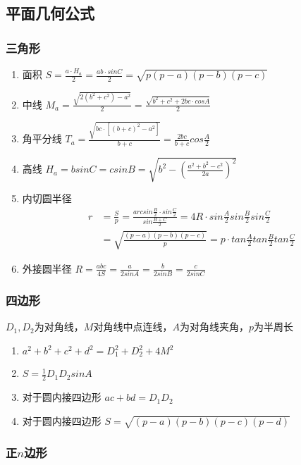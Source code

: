 \documentclass[landscape,twocolumn,a4paper]{article}
\begin{document}
\subsection{平面几何公式}

\subsubsection{三角形}

\begin{enumerate}
	\item 面积
	$S=\frac{a \cdot H_a}{2}=\frac{ab \cdot sinC}{2}=\sqrt{p(p-a)(p-b)(p-c)}$
	\item 中线
	$M_a=\frac{\sqrt{2(b^2+c^2)-a^2}}{2}=\frac{\sqrt{b^2+c^2+2bc \cdot cosA}}{2}$
	\item 角平分线 
	$T_a=\frac{\sqrt{bc \cdot [(b+c)^2-a^2]}}{b+c}=\frac{2bc}{b+c}cos\frac{A}{2}$
	\item 高线
	$H_a=bsinC=csinB=\sqrt{b^2-(\frac{a^2+b^2-c^2}{2a})^2}$
	\item 内切圆半径
	\begin{align*}
	r&=\frac{S}{p}=\frac{arcsin\frac{B}{2} \cdot sin\frac{C}{2}}{sin\frac{B+C}{2}}=4R \cdot sin\frac{A}{2}sin\frac{B}{2}sin\frac{C}{2}\\
	&=\sqrt{\frac{(p-a)(p-b)(p-c)}{p}}=p \cdot tan\frac{A}{2}tan\frac{B}{2}tan\frac{C}{2}
	\end{align*}
	\item 外接圆半径
	$R=\frac{abc}{4S}=\frac{a}{2sinA}=\frac{b}{2sinB}=\frac{c}{2sinC}$
\end{enumerate}

\subsubsection{四边形}

$D_1, D_2$为对角线，$M$对角线中点连线，$A$为对角线夹角，$p$为半周长
\begin{enumerate}
	\item $a^2+b^2+c^2+d^2=D_1^2+D_2^2+4M^2$
	\item $S=\frac{1}{2}D_1D_2sinA$
	\item 对于圆内接四边形
	$ac+bd=D_1D_2$
	\item 对于圆内接四边形
	$S=\sqrt{(p-a)(p-b)(p-c)(p-d)}$
\end{enumerate}

\subsubsection{正$n$边形}
\end{document}
